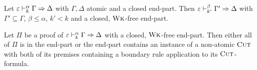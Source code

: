 \begin{fact}\label{lem:cons-elim-wk}
  Let $\varepsilon \vdash^\alpha_k \Gamma \Rightarrow \Delta$ with $\Gamma, \Delta$
  atomic and a closed end-part. Then $\varepsilon \vdash^\beta_{k'} \Gamma' \Rightarrow
  \Delta$ with $\Gamma' \subseteq \Gamma$, $\beta \leq \alpha$, $k' < k$ and a closed,
  $\textsc{Wk}$-free end-part.
\end{fact}

\begin{fact}\label{lem:cons-find-cut}
  Let $\Pi$ be a proof of $\varepsilon \vdash^\alpha_k \Gamma \Rightarrow \Delta$
  with a closed, $\textsc{Wk}$-free end-part. Then either all of $\Pi$ is in the
  end-part or the end-part contains an instance of a non-atomic $\textsc{Cut}$ with
  both of its premises containing a boundary rule application to its $\textsc{Cut}$-formula.
\end{fact}


